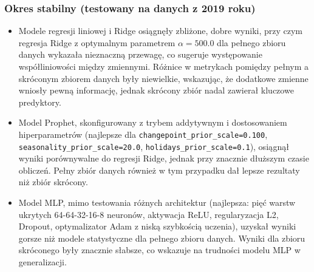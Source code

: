 \subsubsection{Okres stabilny (testowany na danych z 2019 roku)}
\begin{itemize}
    \item Modele regresji liniowej i Ridge osiągnęły zbliżone, dobre wyniki, przy czym regresja Ridge z optymalnym parametrem $\alpha = 500.0$ dla pełnego zbioru danych wykazała nieznaczną przewagę, co sugeruje występowanie współliniowości między zmiennymi. Różnice w metrykach pomiędzy pełnym a skróconym zbiorem danych były niewielkie, wskazując, że dodatkowe zmienne wniosły pewną informację, jednak skrócony zbiór nadal zawierał kluczowe predyktory.
    \item Model Prophet, skonfigurowany z trybem addytywnym i dostosowaniem hiperparametrów (najlepsze dla \texttt{changepoint\_prior\_scale=0.100}, \texttt{seasonality\_prior\_scale=20.0}, \texttt{holidays\_prior\_scale=0.1}), osiągnął wyniki porównywalne do regresji Ridge, jednak przy znacznie dłuższym czasie obliczeń. Pełny zbiór danych również w tym przypadku dał lepsze rezultaty niż zbiór skrócony.
    \item Model MLP, mimo testowania różnych architektur (najlepsza: pięć warstw ukrytych 64-64-32-16-8 neuronów, aktywacja ReLU, regularyzacja L2, Dropout, optymalizator Adam z niską szybkością uczenia), uzyskał wyniki gorsze niż modele statystyczne dla pełnego zbioru danych. Wyniki dla zbioru skróconego były znacznie słabsze, co wskazuje na trudności modelu MLP w generalizacji.
\end{itemize}

